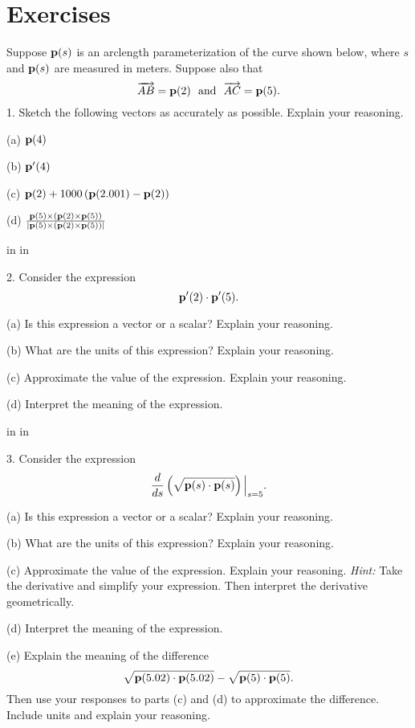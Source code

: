 \documentclass{ximera}
\newcommand{\pskip}{\vskip 0.1 in}
\begin{document}
\section{Exercises}

\begin{question}  \label{Q43esdfgtgre}
Suppose ${\bf p}(s)$ is an arclength parameterization of the curve shown below, where $s$  and ${\bf p}(s)$ are measured in meters. Suppose also that
\[
   \overrightarrow{AB} = {\bf p}(2) \,\,\,\, \text{and} \,\,\,\, \overrightarrow{AC} = {\bf p}(5) .
\]
1. Sketch the following vectors as accurately as possible. Explain your reasoning.

(a) ${\bf p}(4)$

(b) ${\bf p}^\prime(4)$

(c) ${\bf p}(2) + 1000\left( {\bf p}(2.001)-{\bf p}(2)  \right)$

(d) $\frac{{\bf p}(5)\times (  {\bf p}(2)\times {\bf p}(5) )}{| {\bf p}(5)\times (  {\bf p}(2)\times {\bf p}(5) ) |}$

\pskip \pskip

2. Consider the expression
\[
   {\bf p}^\prime(2)\cdot {\bf p}^\prime(5) .
\]

(a) Is this expression a vector or a scalar? Explain your reasoning.

(b) What are the units of this expression? Explain your reasoning.

(c) Approximate the value of the expression. Explain your reasoning.

(d) Interpret the meaning of the expression. 


\pskip \pskip

3. Consider the expression
\[
    \frac{d}{ds} \left( \sqrt{{\bf p}(s) \cdot {\bf p}(s)} \right)\Big|_{s=5} .
\]

(a) Is this expression a vector or a scalar? Explain your reasoning.

(b) What are the units of this expression? Explain your reasoning.

(c) Approximate the value of the expression. Explain your reasoning. {\it Hint:} Take the derivative and simplify your expression. Then interpret the derivative geometrically. 

(d) Interpret the meaning of the expression. 

(e) Explain the meaning of the difference
\[
      \sqrt{{\bf p}(5.02) \cdot {\bf p}(5.02)} - \sqrt{{\bf p}(5) \cdot {\bf p}(5)} .
\]
Then use your responses to parts (c) and (d) to approximate the difference. Include units and explain your reasoning.


 
\begin{onlineOnly}
    \begin{center}
\end{center}
\end{onlineOnly}
\end{question}
\end{document}
